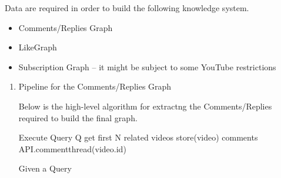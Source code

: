 \documentclass[11pt]{article}
\begin{document}
Data are required in order to build the following knowledge system.

\begin{itemize}
\item Comments/Replies Graph
\item LikeGraph
\item Subscription Graph -- it might be subject to some YouTube restrictions
\end{itemize}


\begin{enumerate}
\item Pipeline for the Comments/Replies Graph
\label{sec:org8a78a8c}

Below is the high-level algorithm for extractng the Comments/Replies 
required to build the final graph.

\begin{latex}
\begin{algorithm}[H]
\SetAlgoLined
{}
 
 Execute Query Q get first N related videos\;	
  {
     store(video)\;		 
     comments \gets API.commentthread(video.id)\;
 }
 
\caption{Given a Query }
\end{algorithm}
\end{latex}
\end{enumerate}
\end{document}
